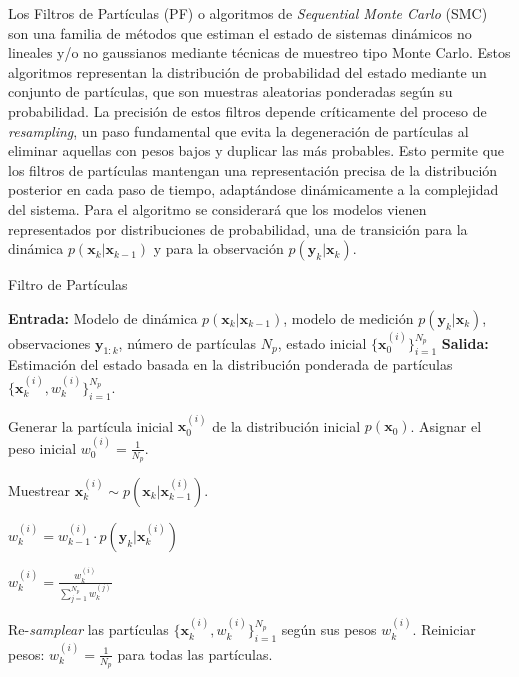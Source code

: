 Los Filtros de Partículas (PF) o algoritmos de \textit{Sequential Monte Carlo} (SMC) \cite{Hammersley1954PoorCarlo, Kemp2003AnMethods, Wills2023SequentialReview} son una familia de métodos que estiman el estado de sistemas dinámicos no lineales y/o no gaussianos mediante técnicas de muestreo tipo Monte Carlo. Estos algoritmos representan la distribución de probabilidad del estado mediante un conjunto de partículas, que son muestras aleatorias ponderadas según su probabilidad. La precisión de estos filtros depende críticamente del proceso de \textit{resampling}, un paso fundamental que evita la degeneración de partículas al eliminar aquellas con pesos bajos y duplicar las más probables. Esto permite que los filtros de partículas mantengan una representación precisa de la distribución posterior en cada paso de tiempo, adaptándose dinámicamente a la complejidad del sistema.
Para el algoritmo se considerará que los modelos vienen representados por distribuciones de probabilidad, una de transición para la dinámica  \( p(\mathbf{x}_k | \mathbf{x}_{k-1}) \) y para la observación \( p(\mathbf{y}_k | \mathbf{x}_k) \).

\begin{algorithm}[h!]
	\caption{Filtro de Partículas}
	\begin{algorithmic}[1]
		
		\State \textbf{Entrada:} Modelo de dinámica \( p(\mathbf{x}_k | \mathbf{x}_{k-1}) \), modelo de medición \( p(\mathbf{y}_k | \mathbf{x}_k) \), observaciones \( \mathbf{y}_{1:k} \), número de partículas \( N_p \), estado inicial \( \{ \mathbf{x}_0^{(i)} \}_{i=1}^{N_p} \)
		\State \textbf{Salida:} Estimación del estado basada en la distribución ponderada de partículas \( \{ \mathbf{x}_k^{(i)}, w_k^{(i)} \}_{i=1}^{N_p} \).
		
		\State Generar la partícula inicial \( \mathbf{x}_0^{(i)} \) de la distribución inicial \( p(\mathbf{x}_0) \).
		\State Asignar el peso inicial \( w_0^{(i)} = \frac{1}{N_p} \).
		\EndFor
		
		
		\State Muestrear \( \mathbf{x}_k^{(i)} \sim p(\mathbf{x}_k | \mathbf{x}_{k-1}^{(i)}) \). 
		\EndFor
		
		\State \( w_k^{(i)} = w_{k-1}^{(i)} \cdot p(\mathbf{y}_k | \mathbf{x}_k^{(i)}) \) 
		\EndFor
		
		\State \( w_k^{(i)} = \frac{w_k^{(i)}}{\sum_{j=1}^{N_p} w_k^{(j)}} \)
		
		\State Re-\textit{samplear} las partículas \( \{ \mathbf{x}_k^{(i)}, w_k^{(i)} \}_{i=1}^{N_p} \) según sus pesos \( w_k^{(i)} \).
		\State Reiniciar pesos: \( w_k^{(i)} = \frac{1}{N_p} \) para todas las partículas.
		\EndIf
		
		\EndFor
		
	\end{algorithmic}
\end{algorithm}

